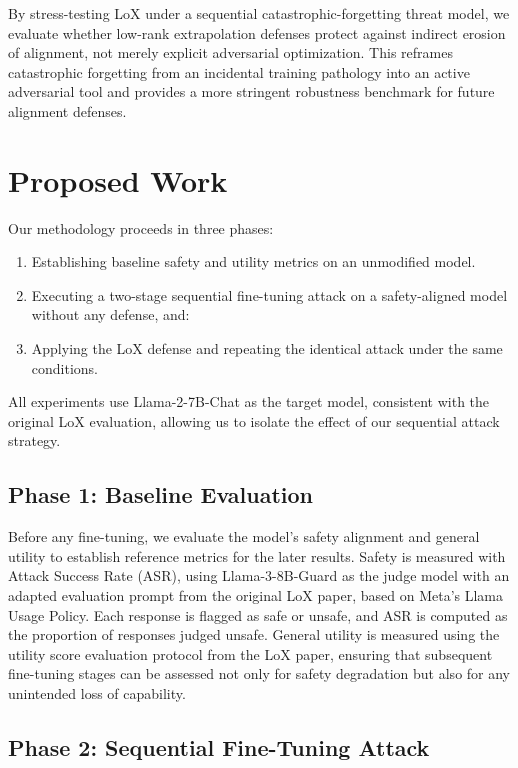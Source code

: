 \documentclass[letterpaper,twocolumn,10pt]{article}
\begin{document}
By stress-testing LoX under a sequential catastrophic-forgetting threat model, we evaluate whether low-rank extrapolation defenses protect against indirect erosion of alignment, not merely explicit adversarial optimization. This reframes catastrophic forgetting from an incidental training pathology into an active adversarial tool and provides a more stringent robustness benchmark for future alignment defenses.


\section{Proposed Work}

Our methodology proceeds in three phases:
\begin{enumerate}
    \item[1.] Establishing baseline safety and utility metrics on an unmodified model.
    \item[2.] Executing a two-stage sequential fine-tuning attack on a safety-aligned model without any defense, and:
    \item[3.] Applying the LoX defense and repeating the identical attack under the same conditions.
\end{enumerate}
All experiments use Llama-2-7B-Chat as the target model, consistent with the original LoX evaluation, allowing us to isolate the effect of our sequential attack strategy.

\subsection{Phase 1: Baseline Evaluation}

Before any fine-tuning, we evaluate the model's safety alignment and general utility to establish reference metrics for the later results. Safety is measured with Attack Success Rate (ASR), using Llama-3-8B-Guard as the judge model with an adapted evaluation prompt from the original LoX paper, based on Meta's Llama Usage Policy. Each response is flagged as safe or unsafe, and ASR is computed as the proportion of responses judged unsafe. General utility is measured using the utility score evaluation protocol from the LoX paper, ensuring that subsequent fine-tuning stages can be assessed not only for safety degradation but also for any unintended loss of capability.

\subsection{Phase 2: Sequential Fine-Tuning Attack}
\end{document}
